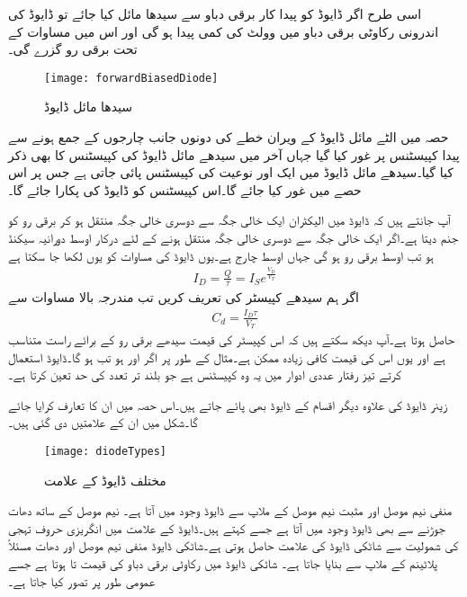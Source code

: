 اسی طرح اگر ڈایوڈ کو پیدا کار برقی دباو  سے سیدھا مائل کیا جائے تو ڈایوڈ کی اندرونی رکاوٹی برقی دباو میں  وولٹ کی کمی پیدا ہو گی اور اس میں مساوات   کے تحت برقی رو گزرے گی۔
\begin{figure}
\centering
\texttt{[image: forwardBiasedDiode]}
\caption{سیدھا مائل  ڈایوڈ}
\label{شکل_سیدھا_مائل_ڈایوڈ}
\end{figure}
حصہ  میں الٹے مائل ڈایوڈ کے ویران خطے کی دونوں جانب چارجوں کے جمع ہونے سے پیدا کپیسٹنس پر غور کیا گیا جہاں آخر میں سیدھے مائل ڈایوڈ کی کپیسٹنس کا بھی ذکر کیا گیا۔سیدھے مائل ڈایوڈ میں ایک اور نوعیت کی کپیسٹنس پائی جاتی ہے جس پر اس حصے میں غور کیا جائے گا۔اس کپیسٹنس کو ڈایوڈ کی  پکارا جائے گا۔

آپ جانتے ہیں کہ ڈایوڈ میں الیکٹران ایک خالی جگہ سے دوسری خالی جگہ منتقل ہو کر برقی رو کو جنم دیتا ہے۔اگر ایک خالی جگہ سے دوسری خالی جگہ منتقل ہونے کے لئے درکار اوسط دورانیہ  سیکنڈ ہو تب اوسط برقی رو  ہو گی جہاں  اوسط چارج ہے۔یوں ڈایوڈ کی مساوات کو یوں لکھا جا سکتا ہے
\begin{align}
I_D=\frac{Q}{\tau}= I_S e^{\frac{V_D}{V_T}}
\end{align}
اگر ہم سیدھے کپیسٹر کی تعریف  کریں تب مندرجہ بالا مساوات سے
\begin{align}\label{مساوات_ڈایوڈ_نفوذی_کپیسٹر}
C_d=\frac{I_D \tau}{V_T}
\end{align} 
حاصل ہوتا ہے۔آپ دیکھ سکتے ہیں کہ اس کپیسٹر کی قیمت سیدھے برقی رو کے برائے راست متناسب ہے اور یوں اس کی قیمت کافی زیادہ ممکن ہے۔مثال کے طور پر اگر  اور  ہو تب  ہو گا۔ڈایوڈ استعمال کرتے تیز رفتار عددی ادوار میں یہ وہ کپیسٹنس ہے جو بلند تر تعدد کی حد تعین کرتا ہے۔

زینر  ڈایوڈ کی علاوہ دیگر اقسام کے  ڈایوڈ بھی پائے جاتے ہیں۔اس حصہ میں ان کا تعارف کرایا جائے گا۔شکل   میں ان کے علامتیں دی گئی ہیں۔
\begin{figure}
\centering
\texttt{[image: diodeTypes]}
\caption{مختلف ڈایوڈ کے علامت}
\label{شکل_مختلف_ڈایوڈ_کے_علامات}
\end{figure}
منفی نیم موصل اور مثبت نیم موصل کے ملاپ سے ڈایوڈ وجود میں آتا ہے۔ نیم موصل کے ساتھ دھات جوڑنے سے بھی  ڈایوڈ وجود میں آتا ہے جسے   کہتے ہیں۔ڈایوڈ کے علامت میں انگریزی حروف تہجی   کی شمولیت سے شاٹکی ڈایوڈ کی علامت حاصل ہوتی ہے۔شاٹکی  ڈایوڈ منفی نیم موصل  اور دھات مسئلاً پلاٹینم کے ملاپ سے بنایا جاتا ہے۔ شاٹکی ڈایوڈ میں رکاوٹی برقی دباو کی قیمت    تا   ہوتا ہے جسے عمومی طور پر   تصور کیا جاتا ہے۔

